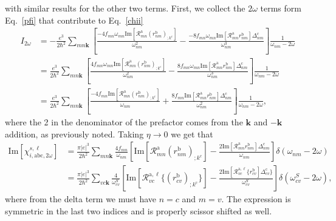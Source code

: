 with similar results for the other two terms. First, we collect the
$2\omega$ terms form Eq.~\eqref{pfi} that contribute to Eq.~\eqref{chii}
\begin{align}\label{2wchii}
I_{2\omega}&=
-\frac{e^3}{2\hbar^2}\sum_{mn\mathbf{k}}
\left[
\frac{-4f_{mn}\omega_{mn}\mathrm{Im}[\mathcal{R}^{\mathrm{a}}_{mn}\left(r^{\mathrm{b}}_{nm}\right)_{;k^{\mathrm{c}}}]}{\omega^2_{nm}}
-
\frac{-8f_{mn}\omega_{mn}\mathrm{Im}[\mathcal{R}^{\mathrm{a}}_{mn}r^{\mathrm{b}}_{nm}]\Delta^{\mathrm{c}}_{nm}}{\omega^3_{nm}}
\right]\frac{1}{\omega_{nm}-2\omega}
\nonumber\\
&=
\frac{e^3}{2\hbar^2}\sum_{mn\mathbf{k}}
\left[
\frac{4f_{mn}\omega_{mn}\mathrm{Im}[\mathcal{R}^{\mathrm{a}}_{mn}\left(r^{\mathrm{b}}_{nm}\right)_{;k^{\mathrm{c}}}]}{\omega^2_{nm}}
-
\frac{8f_{mn}\omega_{mn}\mathrm{Im}[\mathcal{R}^{\mathrm{a}}_{mn}r^{\mathrm{b}}_{nm}]\Delta^{\mathrm{c}}_{nm}}{\omega^3_{nm}}
\right]\frac{1}{\omega_{nm}-2\omega}
\nonumber\\
&=
\frac{e^3}{2\hbar^2}\sum_{mn\mathbf{k}}
\left[
\frac{-4f_{mn}\mathrm{Im}[\mathcal{R}^{\mathrm{a}}_{mn}\left(r^{\mathrm{b}}_{nm}\right)_{;k^{\mathrm{c}}}]}{\omega_{nm}}
+
\frac{8f_{mn}\mathrm{Im}[\mathcal{R}^{\mathrm{a}}_{mn}r^{\mathrm{b}}_{nm}]\Delta^{\mathrm{c}}_{nm}}{\omega^2_{nm}}
\right]\frac{1}{\omega_{nm}-2\omega}
,
\end{align}
where the 2 in the denominator of the prefactor
comes from the $\mathbf{k}$ and $-\mathbf{k}$ addition, as previously noted.
Taking $\eta\to 0$ we get that
\begin{align}\label{imchi2w}
\mathrm{Im}[\chi_{i,\mathrm{a}\mathrm{b}\mathrm{c},2\omega}^{s,\ell}]
&=
\frac{\pi|e|^3}{2\hbar^2}\sum_{mn\mathbf{k}}
\frac{4f_{mn}}{\omega_{nm}}
\left[
\mathrm{Im}[\mathcal{R}^{\mathrm{a}}_{mn}\left(r^{\mathrm{b}}_{nm}\right)_{;k^{\mathrm{c}}}]
-
\frac{2\mathrm{Im}[\mathcal{R}^{\mathrm{a}}_{mn}r^{\mathrm{b}}_{nm}]\Delta^{\mathrm{c}}_{nm}}{\omega_{nm}}
\right]\delta(\omega_{nm}-2\omega)
\nonumber \\
&=
\frac{\pi|e|^3}{2\hbar^2}\sum_{vc\mathbf{k}}
\frac{4}{\omega^S_{cv}}
\left[
\mathrm{Im}[\mathcal{R}^{\mathrm{a},\ell}_{vc}\{\left(r^{\mathrm{b}}_{cv}\right)_{;k^{\mathrm{c}}}\}]
-
\frac{2\mathrm{Im}[\mathcal{R}^{\mathrm{a},\ell}_{vc}\{r^{\mathrm{b}}_{cv}]\Delta^{\mathrm{c}}_{cv}\}}{\omega^S_{cv}}
\right]\delta(\omega^S_{cv}-2\omega)
,
\end{align} 
where from the delta term we must have $n=c$ and $m=v$. The expression
is symmetric in the last two indices and is properly scissor shifted
as well. 

